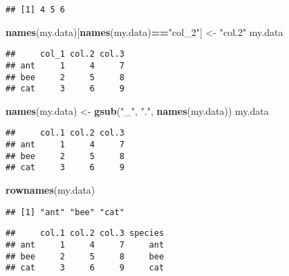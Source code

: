 \documentclass[]{book}
\newenvironment{Shaded}{\begin{snugshade}}{\end{snugshade}}
\newcommand{\KeywordTok}[1]{\textcolor[rgb]{0.13,0.29,0.53}{\textbf{#1}}}
\newcommand{\NormalTok}[1]{#1}
\newcommand{\OperatorTok}[1]{\textcolor[rgb]{0.81,0.36,0.00}{\textbf{#1}}}
\newcommand{\StringTok}[1]{\textcolor[rgb]{0.31,0.60,0.02}{#1}}
\begin{document}
\begin{verbatim}
## [1] 4 5 6
\end{verbatim}

\begin{Shaded}
\begin{Highlighting}[]
\KeywordTok{names}\NormalTok{(my.data)[}\KeywordTok{names}\NormalTok{(my.data)}\OperatorTok{==}\StringTok{"col_2"}\NormalTok{] <-}\StringTok{ "col.2"}
\NormalTok{my.data}
\end{Highlighting}
\end{Shaded}

\begin{verbatim}
##     col_1 col.2 col.3
## ant     1     4     7
## bee     2     5     8
## cat     3     6     9
\end{verbatim}

\begin{Shaded}
\begin{Highlighting}[]
\KeywordTok{names}\NormalTok{(my.data) <-}\StringTok{ }\KeywordTok{gsub}\NormalTok{(}\StringTok{"_"}\NormalTok{, }\StringTok{"."}\NormalTok{, }\KeywordTok{names}\NormalTok{(my.data))}
\NormalTok{my.data}
\end{Highlighting}
\end{Shaded}

\begin{verbatim}
##     col.1 col.2 col.3
## ant     1     4     7
## bee     2     5     8
## cat     3     6     9
\end{verbatim}

\begin{Shaded}
\begin{Highlighting}[]
\KeywordTok{rownames}\NormalTok{(my.data)}
\end{Highlighting}
\end{Shaded}

\begin{verbatim}
## [1] "ant" "bee" "cat"
\end{verbatim}

\begin{Shaded}
\end{Shaded}

\begin{verbatim}
##     col.1 col.2 col.3 species
## ant     1     4     7     ant
## bee     2     5     8     bee
## cat     3     6     9     cat
\end{verbatim}
\end{document}
